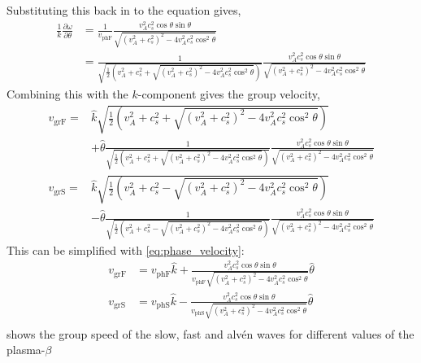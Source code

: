 \documentclass[a4paper]{article}
\begin{document}
Substituting this back in to the equation gives,
\begin{align*}
     \frac{1}{k}\frac{\partial \omega}{\partial \theta} &= \frac{1}{v_{\text{phF}}}  \frac{v_A^2c_s^2\cos\theta\sin\theta}{\sqrt{(v_A^2 + c_s^2)^2 - 4v_A^2c_s^2\cos^2\theta}}\\
     &= \frac{1}{\sqrt{\frac{1}{2}\left(v_A^2 + c_s^2 + \sqrt{(v_A^2 + c_s^2)^2 - 4v_A^2c_s^2\cos^2\theta}\right)}}\frac{v_A^2c_s^2\cos\theta\sin\theta}{\sqrt{(v_A^2 + c_s^2)^2 - 4v_A^2c_s^2\cos^2\theta}}
\end{align*}
Combining this with the $k$-component gives the group velocity,
\begin{align*}
    v_\text{grF} = &\hat{k}\sqrt{\frac{1}{2}\left(v_A^2 + c_s^2 + \sqrt{(v_A^2 + c_s^2)^2 - 4v_A^2c_s^2\cos^2\theta}\right)}\\ &+ \hat{\theta}\frac{1}{\sqrt{\frac{1}{2}\left(v_A^2 + c_s^2 + \sqrt{(v_A^2 + c_s^2)^2 - 4v_A^2c_s^2\cos^2\theta}\right)}}\frac{v_A^2c_s^2\cos\theta\sin\theta}{\sqrt{(v_A^2 + c_s^2)^2 - 4v_A^2c_s^2\cos^2\theta}}\\
    v_\text{grS} = &\hat{k}\sqrt{\frac{1}{2}\left(v_A^2 + c_s^2 - \sqrt{(v_A^2 + c_s^2)^2 - 4v_A^2c_s^2\cos^2\theta}\right)}\\ &- \hat{\theta}\frac{1}{\sqrt{\frac{1}{2}\left(v_A^2 + c_s^2 - \sqrt{(v_A^2 + c_s^2)^2 - 4v_A^2c_s^2\cos^2\theta}\right)}}\frac{v_A^2c_s^2\cos\theta\sin\theta}{\sqrt{(v_A^2 + c_s^2)^2 - 4v_A^2c_s^2\cos^2\theta}}
\end{align*}
This can be simplified with \cref{eq:phase_velocity}:
\begin{align*}
	v_{\text{grF}} &= v_\text{phF}  \hat{k} + \frac{v_A^2c_s^2 \cos \theta \sin \theta}{v_\text{phF} \sqrt{(v_A^2 + c_s^2)^2 - 4v_A^2c_s^2 \cos^2 \theta}} \hat{\theta}\\
	v_{\text{grS}} &= v_\text{phS}  \hat{k} - \frac{v_A^2c_s^2 \cos \theta \sin \theta}{v_\text{phS} \sqrt{(v_A^2 + c_s^2)^2 - 4v_A^2c_s^2 \cos^2 \theta}} \hat{\theta}\\
\end{align*}
 shows the group speed of the slow, fast and alv\'en waves for different values of the plasma-$\beta$
\end{document}
